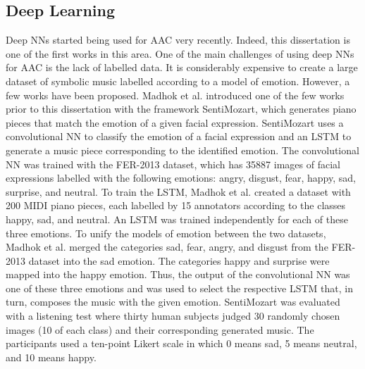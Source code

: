 
\subsection{Deep Learning}

Deep NNs started being used for AAC very recently. Indeed, this dissertation is one of the first works in this area. One of the main challenges of using deep NNs for AAC is the lack of labelled data. It is considerably expensive to create a large dataset of symbolic music labelled according to a model of emotion. However, a few works have been proposed. Madhok et al. \cite{madhok2018sentimozart} introduced one of the few works prior to this dissertation with the framework SentiMozart, which generates piano pieces that match the emotion of a given facial expression. SentiMozart uses a convolutional NN to classify the emotion of a facial expression and an LSTM to generate a music piece corresponding to the identified emotion. The convolutional NN was trained with the FER-2013 \cite{} dataset, which has 35887 images of facial expressions labelled with the following emotions: angry, disgust, fear, happy, sad, surprise, and neutral. To train the LSTM, Madhok et al. \cite{madhok2018sentimozart} created a dataset with 200 MIDI piano pieces, each labelled by 15 annotators according to the classes happy, sad, and neutral. An LSTM was trained independently for each of these three emotions. To unify the models of emotion between the two datasets, Madhok et al.\cite{madhok2018sentimozart} merged the categories sad, fear, angry, and disgust from the FER-2013 dataset into the sad emotion. The categories happy and surprise were mapped into the happy emotion. Thus, the output of the convolutional NN was one of these three emotions and was used to select the respective LSTM that, in turn, composes the music with the given emotion. SentiMozart was evaluated with a listening test where thirty human subjects judged 30 randomly chosen images (10 of each class) and their corresponding generated music. The participants used a ten-point Likert scale in which 0 means sad, 5 means neutral, and 10 means happy.

